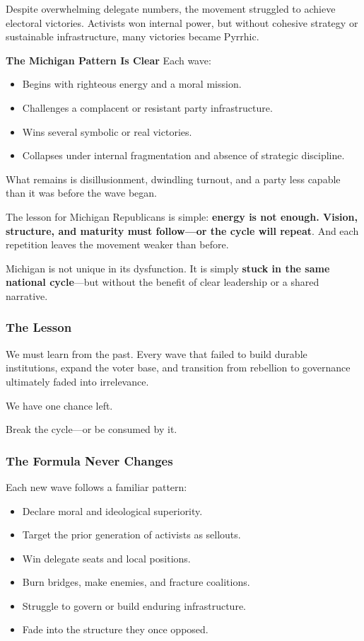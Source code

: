 Despite overwhelming delegate numbers, the movement struggled to achieve electoral victories. Activists won internal power, but without cohesive strategy or sustainable infrastructure, many victories became Pyrrhic.

\textbf{The Michigan Pattern Is Clear}
Each wave:
\begin{itemize}
\item Begins with righteous energy and a moral mission.
\item Challenges a complacent or resistant party infrastructure.
\item Wins several symbolic or real victories.
\item Collapses under internal fragmentation and absence of strategic discipline.
\end{itemize}

What remains is disillusionment, dwindling turnout, and a party less capable than it was before the wave began.

The lesson for Michigan Republicans is simple: \textbf{energy is not enough. Vision, structure, and maturity must follow—or the cycle will repeat}. And each repetition leaves the movement weaker than before.

Michigan is not unique in its dysfunction. It is simply \textbf{stuck in the same national cycle}—but without the benefit of clear leadership or a shared narrative.

\subsubsection{The Lesson}
We must learn from the past. Every wave that failed to build durable institutions, expand the voter base, and transition from rebellion to governance ultimately faded into irrelevance.

We have one chance left.

Break the cycle—or be consumed by it.

\subsubsection{The Formula Never Changes}
Each new wave follows a familiar pattern:
\begin{itemize}
\item Declare moral and ideological superiority.
\item Target the prior generation of activists as sellouts.
\item Win delegate seats and local positions.
\item Burn bridges, make enemies, and fracture coalitions.
\item Struggle to govern or build enduring infrastructure.
\item Fade into the structure they once opposed.
\end{itemize}

